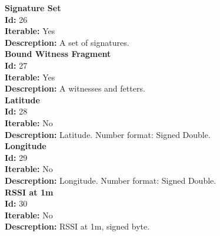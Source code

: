 \documentclass[11pt]{article}
\begin{document}
\noindent
\textbf{Signature Set} \\
\indent \textbf{Id:} 26 \\
\indent \textbf{Iterable:} Yes \\
\indent \textbf{Descreption:} A set of signatures. \\

\noindent
\textbf{Bound Witness Fragment} \\
\indent \textbf{Id:} 27 \\
\indent \textbf{Iterable:} Yes \\
\indent \textbf{Descreption:} A witnesses and fetters. \\

\noindent
\textbf{Latitude} \\
\indent \textbf{Id:} 28 \\
\indent \textbf{Iterable:} No \\
\indent \textbf{Descreption:} Latitude. Number format: Signed Double.\\

\noindent
\textbf{Longitude} \\
\indent \textbf{Id:} 29 \\
\indent \textbf{Iterable:} No \\
\indent \textbf{Descreption:} Longitude. Number format: Signed Double. \\

\noindent
\textbf{RSSI at 1m} \\
\indent \textbf{Id:} 30 \\
\indent \textbf{Iterable:} No \\
\indent \textbf{Descreption:} RSSI at 1m, signed byte.  \\
\end{document}
